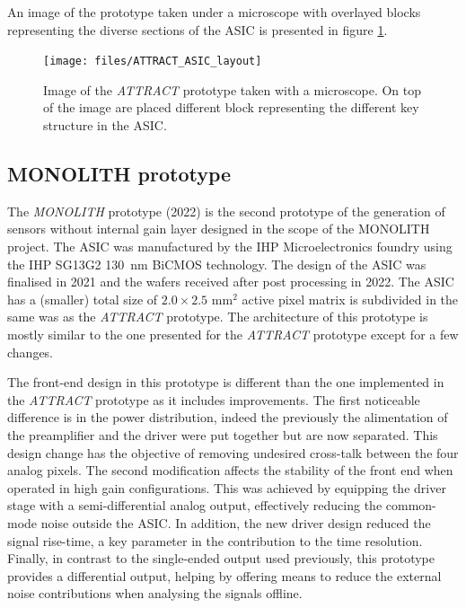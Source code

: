 		An image of the prototype taken under a microscope with overlayed blocks representing the diverse sections of the ASIC is presented in figure \ref{im:ATTRACT_ASIC_layout}.
		\begin{figure}[h]
			\centering
			\texttt{[image: files/ATTRACT\_ASIC\_layout]}
			\caption{Image of the \textit{ATTRACT} prototype taken with a microscope. On top of the image are placed different block representing the different key structure in the ASIC. }
			\label{im:ATTRACT_ASIC_layout}
		\end{figure} 
		
		
		
		
		\subsection{MONOLITH prototype }
		
		The \textit{MONOLITH} prototype (2022) is the second prototype of the generation of sensors without internal gain layer designed in the scope of the MONOLITH project. The ASIC was manufactured by the IHP Microelectronics foundry using the IHP SG13G2 \SI{130}{\nano\meter} BiCMOS technology. The design of the ASIC was finalised in 2021 and the wafers received after post processing in 2022. The ASIC has a (smaller) total size of $2.0 \times 2.5$ mm$^2$ active pixel matrix is subdivided in the same was as the \textit{ATTRACT} prototype. The architecture of this prototype is mostly similar to the one presented for the \textit{ATTRACT} prototype except for a few changes.  
		
		The front-end design in this prototype is different than the one implemented in the \textit{ATTRACT} prototype as it includes improvements. The first noticeable difference is in the power distribution, indeed the previously the alimentation of the preamplifier and the driver were put together but are now separated. This design change has the objective of removing undesired cross-talk between the four analog pixels. The second modification affects the stability of the front end when operated in high gain configurations. This was achieved by equipping the driver stage with a semi-differential analog output, effectively reducing the common-mode noise outside the ASIC. In addition, the new driver design reduced the signal rise-time, a key parameter in the contribution to the time resolution. Finally, in contrast to the single-ended output used previously, this prototype provides a differential output, helping by offering means to reduce the external noise contributions when analysing the signals offline. 
		
